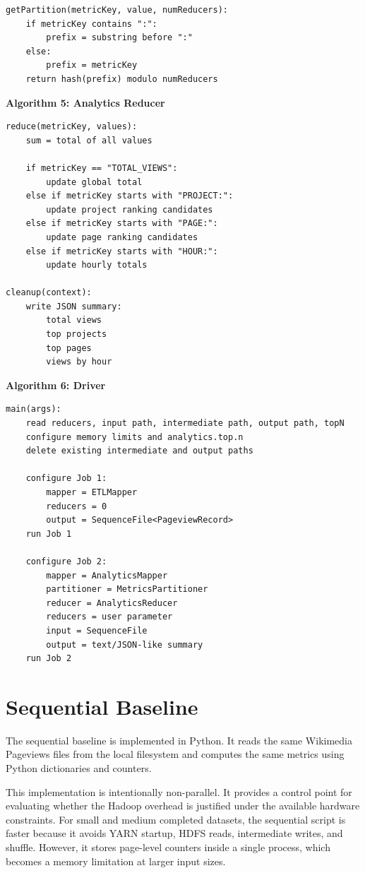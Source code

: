 \documentclass[12pt,a4paper]{report}
\begin{document}
\begin{verbatim}
getPartition(metricKey, value, numReducers):
    if metricKey contains ":":
        prefix = substring before ":"
    else:
        prefix = metricKey
    return hash(prefix) modulo numReducers
\end{verbatim}

\textbf{Algorithm 5: Analytics Reducer}

\begin{verbatim}
reduce(metricKey, values):
    sum = total of all values

    if metricKey == "TOTAL_VIEWS":
        update global total
    else if metricKey starts with "PROJECT:":
        update project ranking candidates
    else if metricKey starts with "PAGE:":
        update page ranking candidates
    else if metricKey starts with "HOUR:":
        update hourly totals

cleanup(context):
    write JSON summary:
        total views
        top projects
        top pages
        views by hour
\end{verbatim}

\textbf{Algorithm 6: Driver}

\begin{verbatim}
main(args):
    read reducers, input path, intermediate path, output path, topN
    configure memory limits and analytics.top.n
    delete existing intermediate and output paths

    configure Job 1:
        mapper = ETLMapper
        reducers = 0
        output = SequenceFile<PageviewRecord>
    run Job 1

    configure Job 2:
        mapper = AnalyticsMapper
        partitioner = MetricsPartitioner
        reducer = AnalyticsReducer
        reducers = user parameter
        input = SequenceFile
        output = text/JSON-like summary
    run Job 2
\end{verbatim}

\section{Sequential Baseline}

The sequential baseline is implemented in Python. It reads the same Wikimedia Pageviews files from the local filesystem and computes the same metrics using Python dictionaries and counters.

This implementation is intentionally non-parallel. It provides a control point for evaluating whether the Hadoop overhead is justified under the available hardware constraints. For small and medium completed datasets, the sequential script is faster because it avoids YARN startup, HDFS reads, intermediate writes, and shuffle. However, it stores page-level counters inside a single process, which becomes a memory limitation at larger input sizes.
\end{document}
